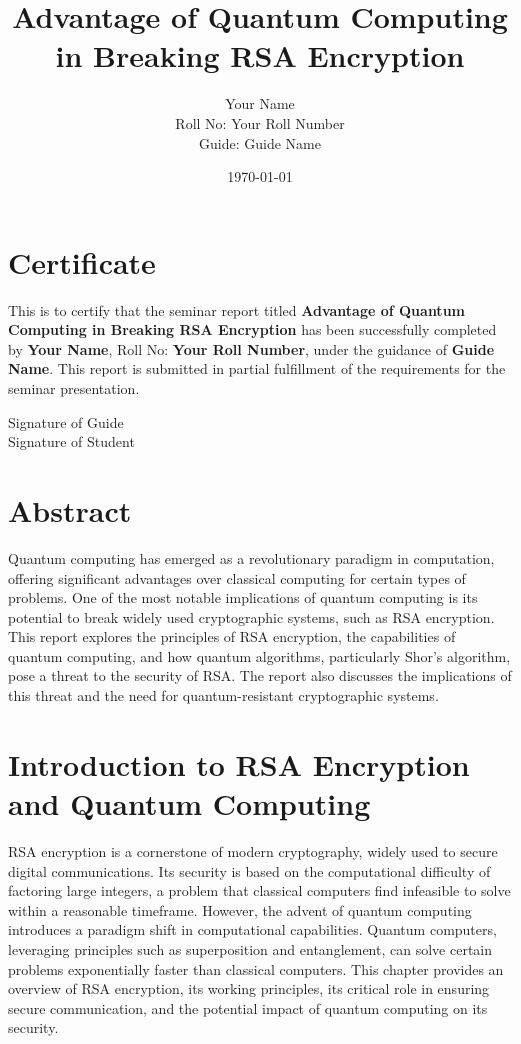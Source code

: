 \documentclass[12pt,a4paper]{report}
\title{Advantage of Quantum Computing in Breaking RSA Encryption}
\author{Your Name \\ Roll No: Your Roll Number \\ Guide: Guide Name}
\date{\today}
\begin{document}
\maketitle

\chapter*{Certificate}
This is to certify that the seminar report titled \textbf{Advantage of Quantum Computing in Breaking RSA Encryption} has been successfully completed by \textbf{Your Name}, Roll No: \textbf{Your Roll Number}, under the guidance of \textbf{Guide Name}. This report is submitted in partial fulfillment of the requirements for the seminar presentation.

\vspace{2cm}
\begin{flushright}
Signature of Guide \\
Signature of Student
\end{flushright}

\newpage

\tableofcontents
\newpage

\chapter*{Abstract}
Quantum computing has emerged as a revolutionary paradigm in computation, offering significant advantages over classical computing for certain types of problems. One of the most notable implications of quantum computing is its potential to break widely used cryptographic systems, such as RSA encryption. This report explores the principles of RSA encryption, the capabilities of quantum computing, and how quantum algorithms, particularly Shor's algorithm, pose a threat to the security of RSA\@. The report also discusses the implications of this threat and the need for quantum-resistant cryptographic systems.

\chapter{Introduction to RSA Encryption and Quantum Computing}

RSA encryption is a cornerstone of modern cryptography, widely used to secure digital communications. Its security is based on the computational difficulty of factoring large integers, a problem that classical computers find infeasible to solve within a reasonable timeframe. However, the advent of quantum computing introduces a paradigm shift in computational capabilities. Quantum computers, leveraging principles such as superposition and entanglement, can solve certain problems exponentially faster than classical computers. This chapter provides an overview of RSA encryption, its working principles, its critical role in ensuring secure communication, and the potential impact of quantum computing on its security.
\end{document}
